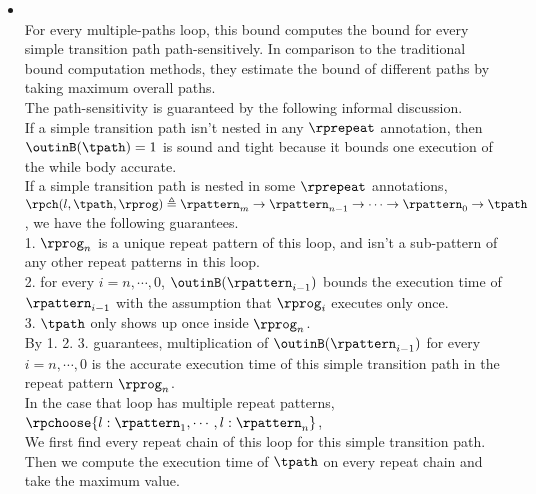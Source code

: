\begin{itemize}
  \item
  \\
  For every multiple-paths loop,
  this bound computes the bound for every simple transition path path-sensitively.
  In comparison to the traditional bound computation methods, they
  estimate the bound of different paths by taking maximum overall paths.
  \\
  The path-sensitivity is guaranteed by the following informal discussion.
  \\
  If a simple transition path isn't nested in any $\rprepeat$ annotation, then
  $\outinB(\tpath) = 1$ is sound and tight because it bounds one execution of the while body accurate.
  \\
  If a simple transition path is nested in some $\rprepeat$ annotations,
  $\rpch(l, \tpath, \rprog) \triangleq \rpattern_m \to \rpattern_{n-1} \to \cdots \to \rpattern_{0} \to \tpath$, we have the following guarantees.
  \\
  1. $\rprog_n$ is a unique repeat pattern of this loop,
  and isn't a sub-pattern of any other repeat patterns in this loop.
  \\
  2. for every $i = n, \cdots, 0$, $\outinB(\rpattern_{i - 1})$ bounds the execution time of $\rpattern_{i - 1}$ with the assumption that $\rprog_{i}$ executes only once.
  \\
  3. $\tpath$ only shows up once inside $\rprog_n$.
  \\
  By 1. 2. 3. guarantees, multiplication of $\outinB(\rpattern_{i - 1})$ for every $i = n, \cdots, 0$ is the accurate execution time of this
  simple transition path in the repeat pattern $\rprog_n$.
  \\
  In the case that loop has multiple repeat patterns, $\rpchoose{l: \rpattern_1, \cdots, l: \rpattern_n}$,
  \\
  We first find every repeat chain of this loop for this simple transition path.
  Then we compute the execution time of $\tpath$ on every repeat chain and take the maximum value.
%  
  \end{itemize}

